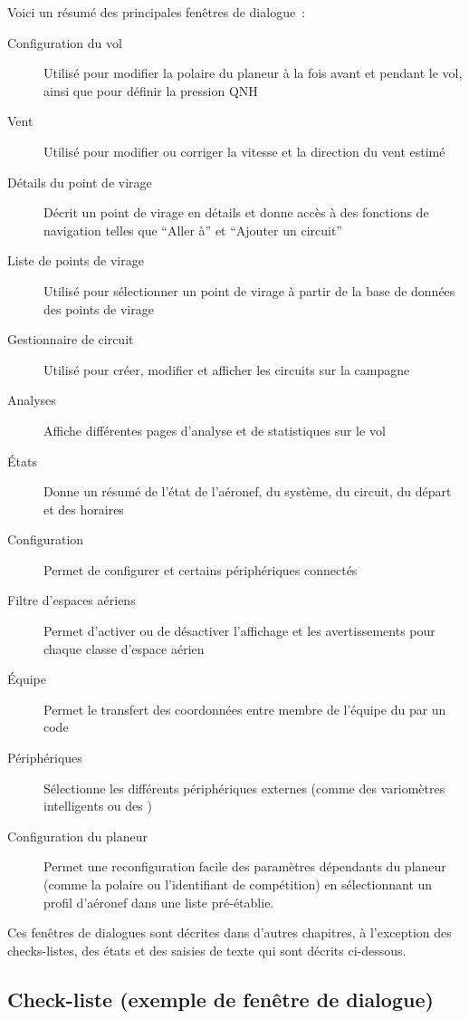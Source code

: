 Voici un résumé des principales fenêtres de dialogue~:
\begin{description}
\item[Configuration du vol] Utilisé pour modifier la polaire du planeur à la fois avant et
pendant le vol, ainsi que pour définir la pression QNH
\item[Vent] Utilisé pour modifier ou corriger la vitesse et la direction du vent estimé
\item[Détails du point de virage] Décrit un point de virage en détails et donne accès à des fonctions
de navigation telles que ``Aller à'' et ``Ajouter un circuit''
\item[Liste de points de virage] Utilisé pour sélectionner un point de virage à partir de la base de données des points de virage
\item[Gestionnaire de circuit] Utilisé pour créer, modifier et afficher les circuits sur la campagne
\item[Analyses] Affiche différentes pages d'analyse et de statistiques sur le vol
\item[États] Donne un résumé de l'état de l'aéronef, du système, du circuit, du départ et des horaires
\item[Configuration] Permet de configurer \xc{} et certains périphériques connectés
\item[Filtre d'espaces aériens] Permet d'activer ou de désactiver l'affichage et les avertissements
pour chaque classe d'espace aérien
\item[Équipe] Permet le transfert des coordonnées entre membre de l'équipe du \fl{} par un
  code
\item[Périphériques] Sélectionne les différents périphériques externes (comme des variomètres intelligents ou
  des \fl{})
\item[Configuration du planeur] Permet une reconfiguration facile des paramètres dépendants du planeur (comme
 la polaire ou l'identifiant de compétition) en sélectionnant un profil d'aéronef dans une liste pré-établie.
\end{description}

Ces fenêtres de dialogues sont décrites dans d'autres chapitres, à l'exception
des checks-listes, des états et des saisies de texte qui sont décrits ci-dessous.

\subsection*{Check-liste (exemple de fenêtre de dialogue)}\label{sec:checklist}

